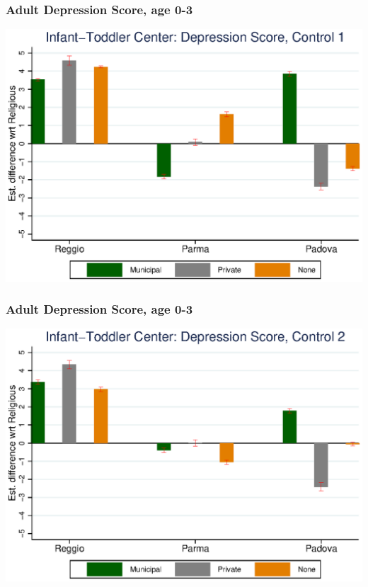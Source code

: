 \documentclass{beamer}
\begin{document}
\begin{frame}\frametitle{Adult Depression Score, age 0-3}
\center
\includegraphics[scale=0.7]{../Output/graphs/D_Asilo_Adult_main.eps}
\end{frame}

\begin{frame}\frametitle{Adult Depression Score, age 0-3}
\center
\includegraphics[scale=0.7]{../Output/graphs/D_Asilo_Adult_inter.eps}
\end{frame}
\end{document}
